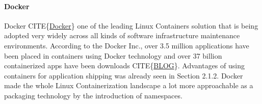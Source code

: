 \documentclass[12pt,titlepage]{article}
\begin{document}
\paragraph{Docker}
\label{sec:orge76d653}
Docker CITE\{\href{https://www.docker.com/}{Docker}\} one of the leading Linux Containers solution that is being
adopted very widely across all kinds of software infrastructure maintenance
environments. According to the Docker Inc., over 3.5 million applications have
been placed in containers using Docker technology and over 37 billion
containerized apps have been downloads CITE\{\href{https://www.zdnet.com/article/what-is-docker-and-why-is-it-so-darn-popular/}{BLOG}\}. Advantages of using
containers for application shipping was already seen in Section 2.1.2. Docker
made the whole Linux Containerization landscape a lot more approachable as a
packaging technology by the introduction of namespaces.
\end{document}
